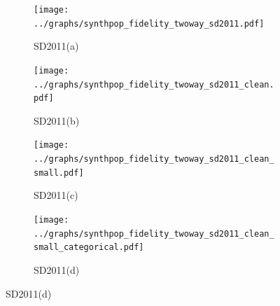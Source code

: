 \begin{figure}
  \caption{Synthpop two-way correlation (SPECKS)}
  \label{fig:synthpop_fidelity_two_way}
  \centering

  \begin{subfigure}{0.45\textwidth}
    \texttt{[image: ../graphs/synthpop\_fidelity\_twoway\_sd2011.pdf]}
    \caption{SD2011(a)}
    \label{fig:synthpop_fidelity_two_way_subfig-a}
  \end{subfigure}
  \hfill
  \begin{subfigure}{0.45\textwidth}
    \texttt{[image: ../graphs/synthpop\_fidelity\_twoway\_sd2011\_clean.pdf]}
    \caption{SD2011(b)}
    \label{fig:synthpop_fidelity_two_way_subfig-b}
  \end{subfigure}

  \vspace{1em}

  \begin{subfigure}{0.45\textwidth}
    \texttt{[image: ../graphs/synthpop\_fidelity\_twoway\_sd2011\_clean\_small.pdf]}
    \caption{SD2011(c)}
    \label{fig:synthpop_fidelity_two_way_subfig-c}
  \end{subfigure}
  \hfill
  \begin{subfigure}{0.45\textwidth}
    \texttt{[image: ../graphs/synthpop\_fidelity\_twoway\_sd2011\_clean\_small\_categorical.pdf]}
    \caption{SD2011(d)}
    \label{fig:synthpop_fidelity_two_way_subfig-d}
  \end{subfigure}
\end{figure}

